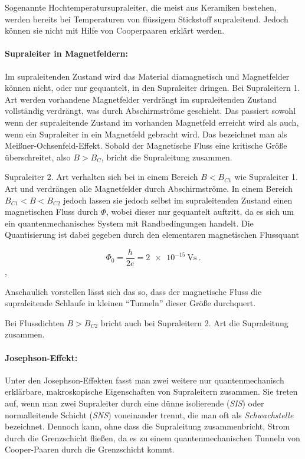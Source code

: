 \documentclass[a4paper,ngerman]{scrartcl}
\begin{document}
Sogenannte Hochtemperatursupraleiter, die meist aus Keramiken
bestehen, werden bereits bei Temperaturen von flüssigem Stickstoff
supraleitend.
Jedoch können sie nicht mit Hilfe von Cooperpaaren erklärt werden.  


\paragraph{Supraleiter in Magnetfeldern:
}
Im supraleitenden Zustand wird das Material diamagnetisch und
Magnetfelder können nicht, oder nur gequantelt, in den Supraleiter
dringen. 
Bei Supraleitern 1. Art werden vorhandene Magnetfelder verdrängt im
supraleitenden Zustand vollständig verdrängt, was durch Abschirmströme
geschieht. 
Das passiert sowohl wenn der supraleitende Zustand im vorhanden
Magnetfeld erreicht wird als auch, wenn ein Supraleiter in ein
Magnetfeld gebracht wird. Das bezeichnet man als
Meißner-Ochsenfeld-Effekt.
Sobald der Magnetische Fluss eine kritische Größe überschreitet,
also $B > B_C$, bricht die Supraleitung zusammen.

Supraleiter 2. Art verhalten sich bei in einem Bereich $B < B_{C1}$
wie Supraleiter 1. Art und verdrängen alle Magnetfelder durch
Abschirmströme. 
In einem Bereich $B_{C1} < B < B_{C2}$ jedoch lassen sie jedoch selbst
im supraleitenden Zustand einen magnetischen Fluss durch $\Phi$, wobei
dieser nur gequantelt auftritt,
da es sich um ein quantenmechanisches System mit Randbedingungen
handelt. Die Quantisierung ist dabei gegeben durch den elementaren
magnetischen Flussquant

\begin{equation}
  \label{eq:phi0}
  \Phi_0 = \frac{h}{2 e} = \SI{2e-15}{\volt\second}~.
\end{equation},

Anschaulich vorstellen lässt sich das so, 
dass der magnetische Fluss die
supraleitende Schlaufe in kleinen "`Tunneln"' dieser Größe durchquert.


Bei Flussdichten $B > B_{C2}$ bricht auch bei Supraleitern 2. Art die
Supraleitung zusammen.


\paragraph{Josephson-Effekt:} Unter den Josephson-Effekten fasst man
zwei weitere nur quantenmechanisch erklärbare, makroskopische
Eigenschaften von Supraleitern zusammen. 
Sie treten auf, wenn man zwei Supraleiter durch eine dünne
isolierende (\emph{SIS}) oder normalleitende
Schicht (\emph{SNS}) voneinander trennt,
die man oft als \emph{Schwachstelle} bezeichnet. 
Dennoch kann, ohne dass die Supraleitung zusammenbricht, Strom durch die Grenzschicht fließen, da es zu einem
quantenmechanischen Tunneln von Cooper-Paaren durch die Grenzschicht kommt.
\end{document}
